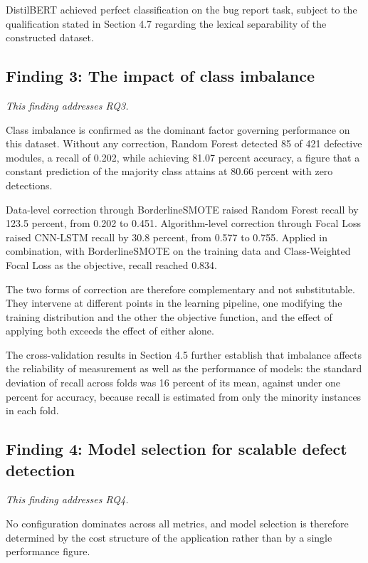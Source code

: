 \documentclass[12pt,a4paper,oneside]{report}
\begin{document}
DistilBERT achieved perfect classification on the bug report task, subject to the qualification stated in Section 4.7 regarding the lexical separability of the constructed dataset.

\subsection{Finding 3: The impact of class imbalance}

\textit{This finding addresses RQ3.}

Class imbalance is confirmed as the dominant factor governing performance on this dataset. Without any correction, Random Forest detected 85 of 421 defective modules, a recall of 0.202, while achieving 81.07 percent accuracy, a figure that a constant prediction of the majority class attains at 80.66 percent with zero detections.

Data-level correction through BorderlineSMOTE raised Random Forest recall by 123.5 percent, from 0.202 to 0.451. Algorithm-level correction through Focal Loss raised CNN-LSTM recall by 30.8 percent, from 0.577 to 0.755. Applied in combination, with BorderlineSMOTE on the training data and Class-Weighted Focal Loss as the objective, recall reached 0.834.

The two forms of correction are therefore complementary and not substitutable. They intervene at different points in the learning pipeline, one modifying the training distribution and the other the objective function, and the effect of applying both exceeds the effect of either alone.

The cross-validation results in Section 4.5 further establish that imbalance affects the reliability of measurement as well as the performance of models: the standard deviation of recall across folds was 16 percent of its mean, against under one percent for accuracy, because recall is estimated from only the minority instances in each fold.

\subsection{Finding 4: Model selection for scalable defect detection}

\textit{This finding addresses RQ4.}

No configuration dominates across all metrics, and model selection is therefore determined by the cost structure of the application rather than by a single performance figure.
\end{document}

